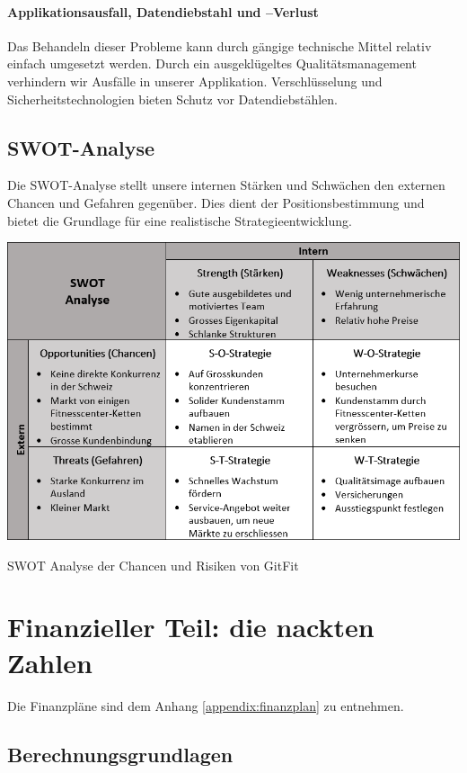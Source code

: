 \paragraph{Applikationsausfall, Datendiebstahl und –Verlust}
Das Behandeln dieser Probleme kann durch gängige technische Mittel relativ einfach umgesetzt werden. Durch ein ausgeklügeltes Qualitätsmanagement verhindern wir Ausfälle in unserer Applikation.  Verschlüsselung und Sicherheitstechnologien bieten Schutz vor Datendiebstählen.

\clearpage

\subsection{SWOT-Analyse}

Die SWOT-Analyse stellt unsere internen Stärken und Schwächen den externen Chancen und Gefahren gegenüber. Dies dient der Positionsbestimmung und bietet die Grundlage für eine realistische Strategieentwicklung.

\begin{table}[H]
	\centering
	\includegraphics[width=1\linewidth]{images/SWOT-analyse}
	\caption{SWOT Analyse der Chancen und Risiken von GitFit}
	\label{fig:swot-analyse}
\end{table}

\clearpage
\section{Finanzieller Teil: die nackten Zahlen}

Die Finanzpläne sind dem Anhang \ref{appendix:finanzplan} zu entnehmen.

\subsection{Berechnungsgrundlagen}

